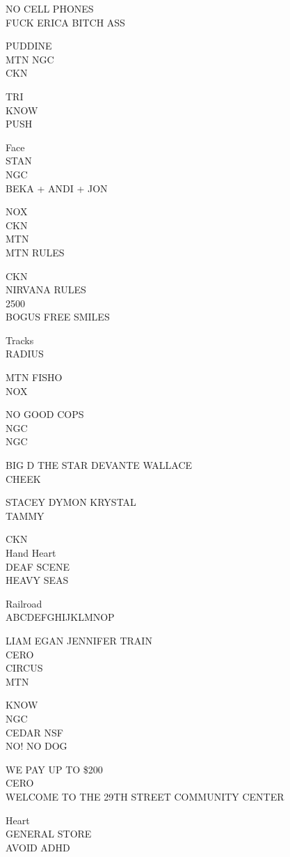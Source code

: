 \documentclass[10pt,letterpaper]{article}
\begin{document}
NO CELL PHONES\\
FUCK ERICA BITCH ASS

PUDDINE\\
MTN NGC\\
CKN

TRI\\
KNOW\\
PUSH

Face\\
STAN\\
NGC\\
BEKA + ANDI + JON

NOX\\
CKN\\
MTN\\
MTN RULES

CKN\\
NIRVANA RULES\\
2500\\
BOGUS FREE SMILES

Tracks\\
RADIUS

MTN FISHO\\
NOX

NO GOOD COPS\\
NGC\\
NGC

BIG D THE STAR DEVANTE WALLACE\\
CHEEK

STACEY DYMON KRYSTAL\\
TAMMY

CKN\\
Hand Heart\\
DEAF SCENE\\
HEAVY SEAS

Railroad\\
ABCDEFGHIJKLMNOP

LIAM EGAN JENNIFER TRAIN\\
CERO\\
CIRCUS\\
MTN

KNOW\\
NGC\\
CEDAR NSF\\
NO! NO DOG

WE PAY UP TO \$200\\
CERO\\
WELCOME TO THE 29TH STREET COMMUNITY CENTER

Heart\\
GENERAL STORE\\
AVOID ADHD
\end{document}
